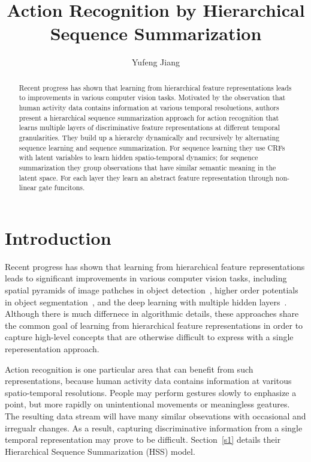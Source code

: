 \documentclass[10pt,twocolumn,letterpaper]{article}
\begin{document}
\title{Action Recognition by Hierarchical Sequence Summarization}
\author{Yufeng Jiang}
\maketitle

\begin{abstract}

Recent progress has shown that learning from hierarchical feature representations leads to improvements in various computer vision tasks. Motivated by the observation that human activity data contains information at various temporal resoluetions, authors present a hierarchical sequence summarization approach for action recognition that learns multiple layers of discriminative feature representations at different temporal granularities. They build up a hierarchy dynamically and recursively by alternating sequence learning and sequence summarization. For sequence learning they use CRFs with latent variables to learn hidden spatio-temporal dynamics; for seqnence summarization they group observations that have similar semantic meaning in the latent space. For each layer they learn an abstract feature representation through non-linear gate funcitons.

\end{abstract}

\section{Introduction}

Recent progress has shown that learning from hierarchical feature representations leads to significant improvements in various computer vision tasks, including spatial pyramids of image pathches in object detection~\cite{Beyond}, higher order potentials in object segmentation~\cite{Learning}, and the deep learning with multiple hidden layers~\cite{hierarchical,On}. Although there is much differnece in algorithmic details, these approaches share the common goal of learning from hierarchical feature representations in order to capture high-level concepts that are otherwise difficult to express with a single reperesentation approach. 

Action recognition is one particular area that can benefit from such representations, because human activity data contains information at varitous spatio-temporal resolutions. People may perform gestures slowly to enphasize a point, but more rapidly on unintentional movements or meaningless geatures. The resulting data stream will have many similar obsevations with occasional and irregualr changes. As a result, capturing discriminative information from a single temporal representation may prove to be difficult. Section~\ref{s1} details their Hierarchical Sequence Summarization (HSS) model.
\end{document}
